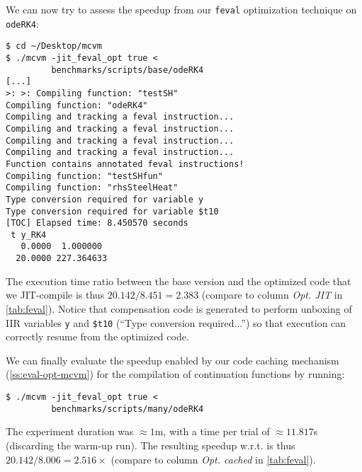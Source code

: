 We can now try to assess the speedup from our {\tt feval} optimization technique on {\tt odeRK4}:

\begin{small}
\begin{verbatim}
$ cd ~/Desktop/mcvm
$ ./mcvm -jit_feval_opt true <
         benchmarks/scripts/base/odeRK4
[...]
>: >: Compiling function: "testSH"
Compiling function: "odeRK4"
Compiling and tracking a feval instruction...
Compiling and tracking a feval instruction...
Compiling and tracking a feval instruction...
Compiling and tracking a feval instruction...
Function contains annotated feval instructions!
Compiling function: "testSHfun"
Compiling function: "rhsSteelHeat"
Type conversion required for variable y
Type conversion required for variable $t10
[TOC] Elapsed time: 8.450570 seconds
 t y_RK4
   0.0000  1.000000
  20.0000 227.364633
\end{verbatim}
\end{small}

\noindent The execution time ratio between the base version and the optimized code that we JIT-compile is thus $20.142/8.451=2.383$ (compare to column {\em Opt. JIT} in \mytable\ref{tab:feval}). Notice that compensation code is generated to perform unboxing of IIR variables {\tt y} and {\tt \$t10} (``Type conversion required...'') so that execution can correctly resume from the optimized code.

We can finally evaluate the speedup enabled by our code caching mechanism (\mysection\ref{ss:eval-opt-mcvm}) for the compilation of continuation functions by running:
\begin{small}
\begin{verbatim}
$ ./mcvm -jit_feval_opt true <
         benchmarks/scripts/many/odeRK4
\end{verbatim}
\end{small}

\noindent The experiment duration was $\approx1$m, with a time per trial of $\approx11.817$s (discarding the warm-up run). The resulting speedup w.r.t. is thus $20.142/8.006=2.516\times$ (compare to column {\em Opt. cached} in \mytable\ref{tab:feval}).

